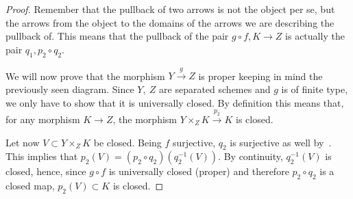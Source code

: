 \documentclass{article}
\newcommand{\exercise}[1]{\noindent {\bf Exercise #1}}
\begin{document}
\begin{proof}
    Remember that the pullback of two arrows is not the object per se, but
    the arrows from the object to the domains of the arrows we are
    describing the pullback of. This means that the pullback of the pair
    $g\circ f,K\rightarrow Z$ is actually the pair $q_1,p_2\circ q_2$.
	
    We will now prove that the morphism $Y\xrightarrow{g} Z$ is proper
    keeping in mind the previously seen diagram. Since $Y,\ Z$ are separated
    schemes and $g$ is of finite type, we only have to show that it is
    universally closed. By definition this means that, for any morphism
    $K\rightarrow Z$, the morphism $Y\times_Z K\xrightarrow{p_2} K$ is
    closed.
	
    Let now $V\subset Y\times_Z K$ be closed. Being $f$ surjective, $q_2$ is
    surjective as well by~\cite[p. 120, prop. 4]{Mum88}. This implies that
    $p_2(V)=(p_2\circ q_2)(q_2^{-1}(V))$. By continuity, $q_2^{-1}(V)$ is
    closed, hence, since $g\circ f$ is universally closed (proper) and
    therefore $p_2\circ q_2$ is a closed map, $p_2(V)\subset K$ is closed.
\end{proof}


~\\
\exercise{3}
\end{document}
